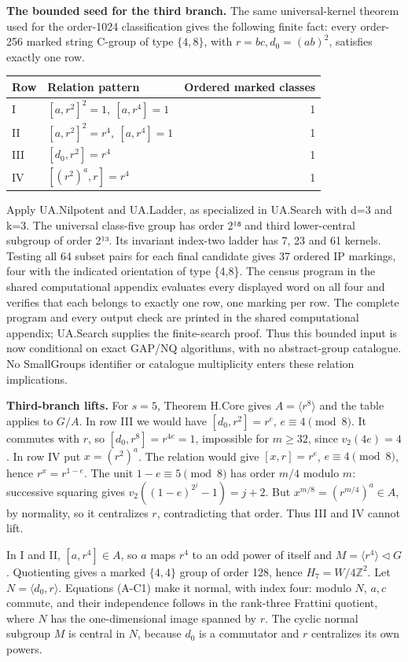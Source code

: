 \textbf{The bounded seed for the third branch.} The same universal-kernel theorem used for the order-1024 classification gives the following finite fact: every order-256 marked string C-group of type \(\{4,8\}\), with \(r=bc,d_0=(ab)^2\), satisfies exactly one row.

{\def\LTcaptype{none} %
\begin{longtable}[]{@{}llr@{}}
\toprule\noalign{}
Row & Relation pattern & Ordered marked classes \\
\midrule\noalign{}
\endhead
\bottomrule\noalign{}
\endlastfoot
I & \([a,r^2]^2=1,\ [a,r^4]=1\) & 1 \\
II & \([a,r^2]^2=r^4,\ [a,r^4]=1\) & 1 \\
III & \([d_0,r^2]=r^4\) & 1 \\
IV & \([(r^2)^a,r]=r^4\) & 1 \\
\end{longtable}
}

Apply UA.Nilpotent and UA.Ladder, as specialized in UA.Search with d=3 and k=3. The universal class-five group has order 2¹⁸ and third lower-central subgroup of order 2¹³. Its invariant index-two ladder has 7, 23 and 61 kernels. Testing all 64 subset pairs for each final candidate gives 37 ordered IP markings, four with the indicated orientation of type \{4,8\}. The census program in the shared computational appendix evaluates every displayed word on all four and verifies that each belongs to exactly one row, one marking per row. The complete program and every output check are printed in the shared computational appendix; UA.Search supplies the finite-search proof. Thus this bounded input is now conditional on exact GAP/NQ algorithms, with no abstract-group catalogue. No SmallGroups identifier or catalogue multiplicity enters these relation implications.

\textbf{Third-branch lifts.} For \(s=5\), Theorem H.Core gives \(A=\langle r^8\rangle\) and the table applies to \(G/A\). In row III we would have \([d_0,r^2]=r^e\), \(e\equiv4\pmod8\). It commutes with \(r\), so \([d_0,r^8]=r^{4e}=1\), impossible for \(m\ge32\), since \(v_2(4e)=4\). In row IV put \(x=(r^2)^a\). The relation would give \([x,r]=r^e\), \(e\equiv4\pmod8\), hence \(r^x=r^{1-e}\). The unit \(1-e\equiv5\pmod8\) has order \(m/4\) modulo \(m\): successive squaring gives \(v_2((1-e)^{2^j}-1)=j+2\). But \(x^{m/8}=(r^{m/4})^a\in A\), by normality, so it centralizes \(r\), contradicting that order. Thus III and IV cannot lift.

In I and II, \([a,r^4]\in A\), so \(a\) maps \(r^4\) to an odd power of itself and \(M=\langle r^4\rangle\lhd G\). Quotienting gives a marked \(\{4,4\}\) group of order 128, hence \(H_7=W/4\mathbb Z^2\). Let \(N=\langle d_0,r\rangle\). Equations (A-C1) make it normal, with index four: modulo \(N\), \(a,c\) commute, and their independence follows in the rank-three Frattini quotient, where \(N\) has the one-dimensional image spanned by \(r\). The cyclic normal subgroup \(M\) is central in \(N\), because \(d_0\) is a commutator and \(r\) centralizes its own powers.

